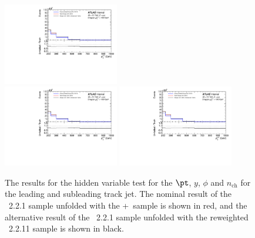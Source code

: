 \begin{figure}[h!]
  \includegraphics[page=636,width=0.45\textwidth]{figures/IBUClosureTests.pdf} \\
  \includegraphics[page=666,width=0.45\textwidth]{figures/IBUClosureTests.pdf}
  \includegraphics[page=672,width=0.45\textwidth]{figures/IBUClosureTests.pdf}
  \caption{The results for the hidden variable test for the $\pt$, $y$, $\phi$ and $n_{\text{ch}}$ for the leading and subleading track jet. The nominal result of the \sherpa~2.2.1 sample unfolded with the \powheg+\pythia~sample is shown in red, and the alternative result of the \sherpa~2.2.1 sample unfolded with the reweighted \sherpa~2.2.11 sample is shown in black.}
  \label{fig:HVTestTJ1}
\end{figure}

